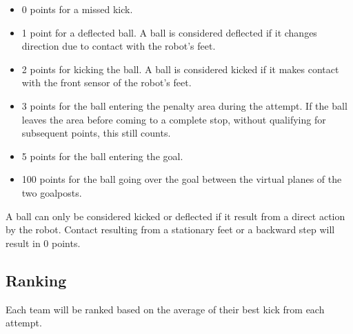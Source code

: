 \begin{itemize}
	\item 0 points for a missed kick.
	\item 1 point for a deflected ball.
	A ball is considered deflected if it changes direction due to contact with the robot's feet.
	\item 2 points for kicking the ball.
	A ball is considered kicked if it makes contact with the front sensor of the robot's feet.
	\item 3 points for the ball entering the penalty area during the attempt. 
	If the ball leaves the area before coming to a complete stop, without qualifying for subsequent points, this still counts. 
	\item 5 points for the ball entering the goal. 
	\item 100 points for the ball going over the goal between the virtual planes of the two goalposts. 
  \end{itemize}

  A ball can only be considered kicked or deflected if it result from a direct action by the robot.
  Contact resulting from a stationary feet or a backward step will result in 0 points.

  \subsection{Ranking}

  Each team will be ranked based on the average of their best kick from each attempt.